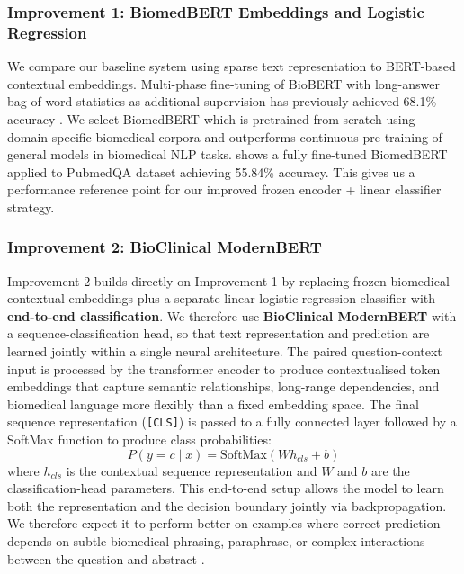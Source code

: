 \documentclass[11pt]{article}
\begin{document}
\subsubsection{Improvement 1: BiomedBERT Embeddings and Logistic Regression}
We compare our baseline system using sparse text representation to BERT-based contextual embeddings. Multi-phase fine-tuning of BioBERT with long-answer bag-of-word statistics as additional supervision has previously achieved 68.1\% accuracy \cite{jin_pubmedqa_2019}. We select BiomedBERT which is pretrained from scratch using domain-specific biomedical corpora and outperforms continuous pre-training of general models in biomedical NLP tasks. \cite{gu_domain-specific_2021} shows a fully fine-tuned BiomedBERT applied to PubmedQA dataset achieving 55.84\% accuracy. This gives us a performance reference point for our improved frozen encoder + linear classifier strategy. \par

\subsubsection{Improvement 2: BioClinical ModernBERT}
Improvement 2 builds directly on Improvement 1 by replacing frozen biomedical contextual embeddings plus a separate linear logistic-regression classifier with \textbf{end-to-end classification}. We therefore use \textbf{BioClinical ModernBERT} with a sequence-classification head, so that text representation and prediction are learned jointly within a single neural architecture. The paired question-context input is processed by the transformer encoder to produce contextualised token embeddings that capture semantic relationships, long-range dependencies, and biomedical language more flexibly than a fixed embedding space. The final sequence representation (\texttt{[CLS]}) is passed to a fully connected layer followed by a SoftMax function to produce class probabilities:
\[
P(y = c \mid x) = \text{SoftMax}(W h_{cls} + b)
\]
where \(h_{cls}\) is the contextual sequence representation and \(W\) and \(b\) are the classification-head parameters. This end-to-end setup allows the model to learn both the representation and the decision boundary jointly via backpropagation. We therefore expect it to perform better on examples where correct prediction depends on subtle biomedical phrasing, paraphrase, or complex interactions between the question and abstract \cite{gu_domain-specific_2021, warner_smarter_2025}. \par
\end{document}
